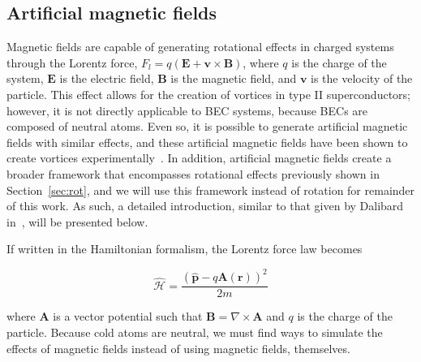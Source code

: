 \subsection{Artificial magnetic fields}
\label{sec:gauge}

Magnetic fields are capable of generating rotational effects in charged systems through the Lorentz force, $F_l = q(\mathbf{E} + \mathbf{v} \times \mathbf{B})$, where $q$ is the charge of the system, $\mathbf{E}$ is the electric field, $\mathbf{B}$ is the magnetic field, and $\mathbf{v}$ is the velocity of the particle.
This effect allows for the creation of vortices in type II superconductors; however, it is not directly applicable to BEC systems, because BECs are composed of neutral atoms.
Even so, it is possible to generate artificial magnetic fields with similar effects, and these artificial magnetic fields have  been shown to create vortices experimentally~\cite{lin2009}.
In addition, artificial magnetic fields create a broader framework that encompasses rotational effects previously shown in Section~\ref{sec:rot}, and we will use this framework instead of rotation for remainder of this work.
As such, a detailed introduction, similar to that given by Dalibard in~\cite{dalibard2015}, will be presented below.

If written in the Hamiltonian formalism, the Lorentz force law becomes

\begin{equation}
\mathcal{\hat{H}} = \frac{(\mathbf{\hat p} - q\mathbf{A}(\mathbf{r}))^2}{2m}
\end{equation}

\noindent where $\mathbf{A}$ is a vector potential such that $\mathbf{B} = \nabla \times \mathbf{A}$ and $q$ is the charge of the particle.
Because cold atoms are neutral, we must find ways to simulate the effects of magnetic fields instead of using magnetic fields, themselves.

